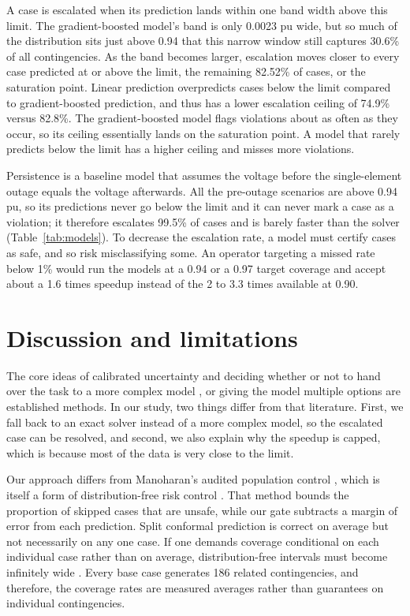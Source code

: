 \documentclass[conference]{IEEEtran}
\begin{document}
A case is escalated when its prediction lands within one band width above this limit. The gradient-boosted model's band is only 0.0023 pu wide, but so much of the distribution sits just above 0.94 that this narrow window still captures 30.6\% of all contingencies. As the band becomes larger, escalation moves closer to every case predicted at or above the limit, the remaining 82.52\% of cases, or the saturation point. Linear prediction overpredicts cases below the limit compared to gradient-boosted prediction, and thus has a lower escalation ceiling of 74.9\% versus 82.8\%. The gradient-boosted model flags violations about as often as they occur, so its ceiling essentially lands on the saturation point. A model that rarely predicts below the limit has a higher ceiling and misses more violations.

Persistence is a baseline model that assumes the voltage before the single-element outage equals the voltage afterwards. All the pre-outage scenarios are above 0.94 pu, so its predictions never go below the limit and it can never mark a case as a violation; it therefore escalates 99.5\% of cases and is barely faster than the solver (Table~\ref{tab:models}). To decrease the escalation rate, a model must certify cases as safe, and so risk misclassifying some. An operator targeting a missed rate below 1\% would run the models at a 0.94 or a 0.97 target coverage and accept about a 1.6 times speedup instead of the 2 to 3.3 times available at 0.90.

\section{Discussion and limitations}
The core ideas of calibrated uncertainty and deciding whether or not to hand over the task to a more complex model \cite{desalvo2015}, or giving the model multiple options \cite{angelopoulos2024,cortes2016,chow1970} are established methods. In our study, two things differ from that literature. First, we fall back to an exact solver instead of a more complex model, so the escalated case can be resolved, and second, we also explain why the speedup is capped, which is because most of the data is very close to the limit.

Our approach differs from Manoharan's audited population control \cite{manoharan2026}, which is itself a form of distribution-free risk control \cite{bates2021}. That method bounds the proportion of skipped cases that are unsafe, while our gate subtracts a margin of error from each prediction. Split conformal prediction is correct on average but not necessarily on any one case. If one demands coverage conditional on each individual case rather than on average, distribution-free intervals must become infinitely wide \cite{barber2021}. Every base case generates 186 related contingencies, and therefore, the coverage rates are measured averages rather than guarantees on individual contingencies.
\end{document}
